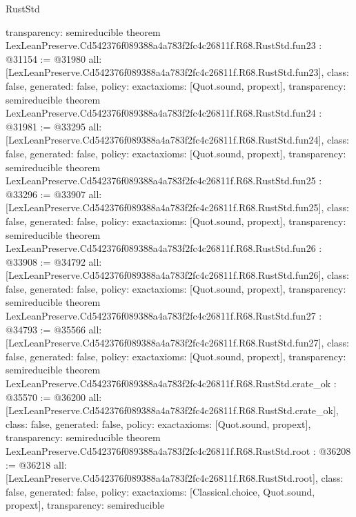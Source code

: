\begin{lexlean}{RustStd}
\begin{coremodule}
{  transparency: semireducible
}
theorem LexLeanPreserve.Cd542376f089388a4a783f2fc4c26811f.R68.RustStd.fun23 : @31154 := @31980 {
  all: [LexLeanPreserve.Cd542376f089388a4a783f2fc4c26811f.R68.RustStd.fun23],
  class: false,
  generated: false,
  policy: exact{axioms: [Quot.sound, propext]},
  transparency: semireducible
}
theorem LexLeanPreserve.Cd542376f089388a4a783f2fc4c26811f.R68.RustStd.fun24 : @31981 := @33295 {
  all: [LexLeanPreserve.Cd542376f089388a4a783f2fc4c26811f.R68.RustStd.fun24],
  class: false,
  generated: false,
  policy: exact{axioms: [Quot.sound, propext]},
  transparency: semireducible
}
theorem LexLeanPreserve.Cd542376f089388a4a783f2fc4c26811f.R68.RustStd.fun25 : @33296 := @33907 {
  all: [LexLeanPreserve.Cd542376f089388a4a783f2fc4c26811f.R68.RustStd.fun25],
  class: false,
  generated: false,
  policy: exact{axioms: [Quot.sound, propext]},
  transparency: semireducible
}
theorem LexLeanPreserve.Cd542376f089388a4a783f2fc4c26811f.R68.RustStd.fun26 : @33908 := @34792 {
  all: [LexLeanPreserve.Cd542376f089388a4a783f2fc4c26811f.R68.RustStd.fun26],
  class: false,
  generated: false,
  policy: exact{axioms: [Quot.sound, propext]},
  transparency: semireducible
}
theorem LexLeanPreserve.Cd542376f089388a4a783f2fc4c26811f.R68.RustStd.fun27 : @34793 := @35566 {
  all: [LexLeanPreserve.Cd542376f089388a4a783f2fc4c26811f.R68.RustStd.fun27],
  class: false,
  generated: false,
  policy: exact{axioms: [Quot.sound, propext]},
  transparency: semireducible
}
theorem LexLeanPreserve.Cd542376f089388a4a783f2fc4c26811f.R68.RustStd.crate_ok : @35570 := @36200 {
  all: [LexLeanPreserve.Cd542376f089388a4a783f2fc4c26811f.R68.RustStd.crate_ok],
  class: false,
  generated: false,
  policy: exact{axioms: [Quot.sound, propext]},
  transparency: semireducible
}
theorem LexLeanPreserve.Cd542376f089388a4a783f2fc4c26811f.R68.RustStd.root : @36208 := @36218 {
  all: [LexLeanPreserve.Cd542376f089388a4a783f2fc4c26811f.R68.RustStd.root],
  class: false,
  generated: false,
  policy: exact{axioms: [Classical.choice, Quot.sound, propext]},
  transparency: semireducible
}


\end{coremodule}
\end{lexlean}
